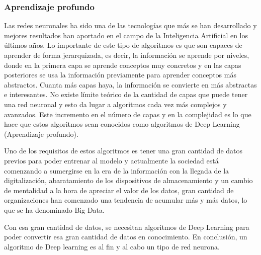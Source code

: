 \subsubsection{Aprendizaje profundo}
Las redes neuronales ha sido una de las tecnologías que más se han desarrollado y mejores resultados han aportado en el campo de la Inteligencia Artificial en los últimos años. Lo importante de este tipo de algoritmos es que son capaces de aprender de forma jerarquizada, es decir, la información se aprende por niveles, donde en la primera capa se aprende conceptos muy concretos y en las capas posteriores se usa la información previamente para aprender conceptos más abstractos. Cuanta más capas haya, la información se convierte en más abstractas e interesantes. No existe límite teórico de la cantidad de capas que puede tener una red neuronal y esto da lugar a algoritmos cada vez más complejos y avanzados. Este incremento en el número de capas y en la complejidad es lo que hace que estos algoritmos sean conocidos como algoritmos de Deep Learning (Aprendizaje profundo).
\newline

Uno de los requisitos de estos algoritmos es tener una gran cantidad de datos previos para poder entrenar al modelo y actualmente la sociedad está comenzando a sumergirse en la era de la información con la llegada de la digitalización, abaratamiento de los dispositivos de almacenamiento y un cambio de mentalidad a la hora de apreciar el valor de los datos, gran cantidad de organizaciones han comenzado una tendencia de acumular más y más datos, lo que se ha denominado Big Data.
\newline

Con esa gran cantidad de datos, se necesitan algoritmos de Deep Learning para poder convertir esa gran cantidad de datos en conocimiento. En conclusión, un algoritmo de Deep learning es al fin y al cabo un tipo de red neurona.
\newline